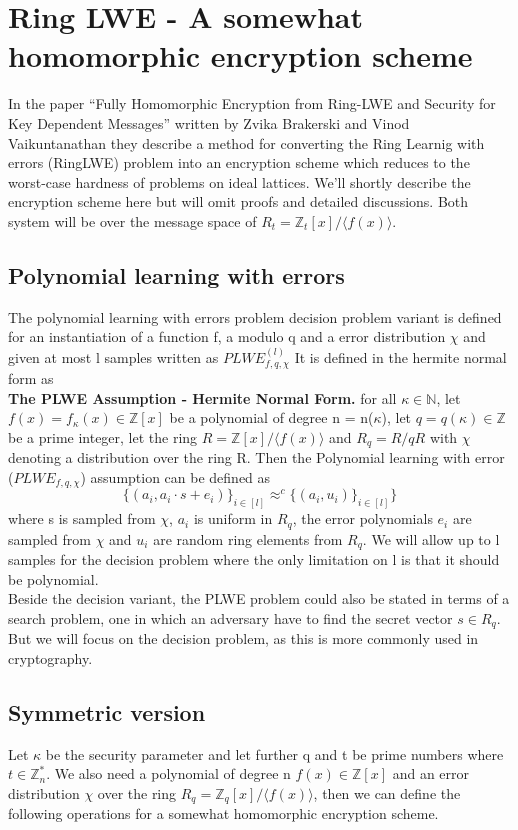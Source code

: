 \documentclass[../main.tex]{subfiles}
\begin{document}
\section{Ring LWE - A somewhat homomorphic encryption scheme} \label{section: RLWE theory}
In the paper ``Fully Homomorphic Encryption from Ring-LWE and Security for Key Dependent Messages'' written by
Zvika Brakerski and Vinod Vaikuntanathan \cite{brakerski2011fully}
they describe a method for converting the Ring Learnig with errors (RingLWE) problem into an encryption scheme
which reduces to the worst-case hardness of problems on ideal lattices.
We'll shortly describe the encryption scheme here but will omit proofs and detailed discussions.
Both system will be over the message space of $R_t = \mathbb{Z}_t[x] / \langle f(x) \rangle $.

\subsection{Polynomial learning with errors}
The polynomial learning with errors problem decision problem variant is defined for an instantiation
of a function f, a modulo q and a error distribution $\chi$ and given at most l samples written as $PLWE_{f, q, \chi}^(l)$
It is defined in the hermite normal form as
\\[2mm]
\textbf{The PLWE Assumption - Hermite Normal Form.}
for all $\kappa \in \mathbb{N}$, let $f(x) = f_{\kappa}(x) \in \mathbb{Z}[x]$
be a polynomial of degree n = n($\kappa$), let $q = q(\kappa) \in \mathbb{Z}$
be a prime integer, let the ring $R = \mathbb{Z}[x] / \langle f(x) \rangle$
and $R_q = R / qR$ with $\chi$ denoting a distribution over the ring R.
Then the Polynomial learning with error ($PLWE_{f,q,\chi}$) assumption can be defined as
\[
    \{ (a_i, a_i \cdot s + e_i) \}_{i \in [l]} \approx^{c} \{(a_i, u_i) \}_{i \in [l]}\}
\]
where s is sampled from $\chi$, $a_i$ is uniform in $R_q$, the error polynomials
$e_i$ are sampled from $\chi$ and $u_i$ are random ring elements from $R_q$.
We will allow up to l samples for the decision problem where the only limitation on l is that it should
be polynomial.
\\[5mm]
Beside the decision variant, the PLWE problem could also be stated in terms of a search problem, one in which
an adversary have to find the secret vector $s \in R_q$. But we will focus on the decision problem, as this
is more commonly used in cryptography.

\subsection{Symmetric version}
Let $\kappa$ be the security parameter and let further q and t be prime numbers where $t \in \mathbb{Z}_n^*$.
We also need a polynomial of degree n $f(x) \in \mathbb{Z}[x]$ and an error distribution $\chi$ over the ring
$R_q = \mathbb{Z}_q[x] / \langle f(x) \rangle$, then we can define the following operations for a somewhat homomorphic
encryption scheme.
\end{document}
